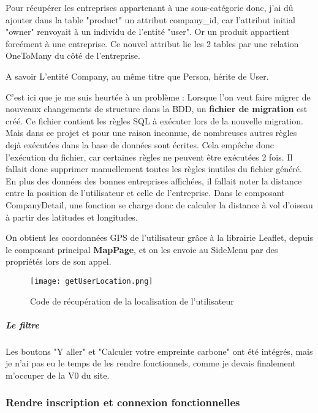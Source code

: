 Pour récupérer les entreprises appartenant à une sous-catégorie donc, j'ai dû ajouter dans la table "product" un attribut company\_id, car l'attribut initial "owner" renvoyait à un individu de l'entité "user". 
Or un produit appartient forcément à une entreprise. 
Ce nouvel attribut lie les 2 tables par une relation OneToMany du côté de l'entreprise.

\begin{callout}{A savoir}
    L'entité Company, au même titre que Person, hérite de User.
\end{callout}

C'est ici que je me suis heurtée à un problème : Lorsque l'on veut faire migrer de nouveaux changements de structure dans la BDD, un \textbf{fichier de migration} est créé.
Ce fichier contient les règles SQL à exécuter lors de la nouvelle migration. Mais dans ce projet et pour une raison inconnue, de nombreuses autres règles dejà exécutées dans la base de données sont écrites.
Cela empêche donc l'exécution du fichier, car certaines règles ne peuvent être exécutées 2 fois. Il fallait donc supprimer manuellement toutes les règles inutiles du fichier généré.\\

En plus des données des bonnes entreprises affichées, il fallait noter la distance entre la position de l'utilisateur et celle de l'entreprise. 
Dans le composant CompanyDetail, une fonction se charge donc de calculer la distance à vol d'oiseau à partir des latitudes et longitudes.

On obtient les coordonnées GPS de l'utilisateur grâce à la librairie Leaflet, depuis le composant principal \textbf{MapPage}, et on les envoie au SideMenu par des propriétés lors de son appel.

\begin{figure}[H]
    \texttt{[image: getUserLocation.png]}
    \caption{Code de récupération de la localisation de l'utilisateur}
\end{figure}

\subparagraph{Le filtre}





Les boutons "Y aller" et "Calculer votre empreinte carbone" ont été intégrés, mais je n'ai pas eu le temps de les rendre fonctionnels, comme je devais finalement m'occuper de la V0 du site.



\subsubsection{Rendre inscription et connexion fonctionnelles}

